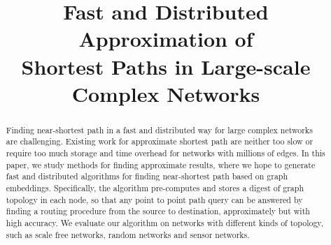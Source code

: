 \documentclass[conference]{IEEEtran}
\begin{document}

\title{Fast and Distributed Approximation of\\ Shortest Paths in Large-scale Complex Networks}

\vspace{-0.4in}
\maketitle



\vspace{-1in}
\begin{abstract}

Finding near-shortest path in a fast and distributed way for large complex networks are challenging. Existing work for approximate shortest path are neither too slow or require too much storage and time overhead for networks with millions of edges. In this paper, we study methods for finding approximate results, where we hope to generate fast and distributed algorithms for finding near-shortest path based on graph embeddings. Specifically, the algorithm pre-computes and stores a digest of graph topology in each node, so that any point to point path query can be answered by finding a routing procedure from the source to destination, approximately but with high accuracy. We evaluate our algorithm on networks with different kinds of topology, such as scale free networks, random networks and sensor networks.

\end{abstract}








%



{\small


}
\end{document}
